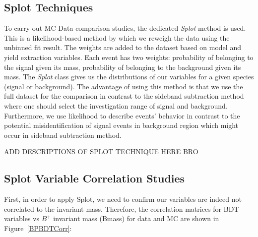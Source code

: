 \subsection{\textbf{Splot} Techniques}

To carry out MC-Data comparison studies, the dedicated \textit{Splot} method is used. This is a likelihood-based method by which we reweigh the data using the unbinned fit result. The weights are added to the dataset based on model and yield extraction variables. Each event has two weights: probability of belonging to the signal given its mass, probability of belonging to the background given its mass. The \textit{Splot} class gives us the distributions of our variables for a given species (signal or background). The advantage of using this method is that we use the full dataset for the comparison in contrast to the sideband subtraction method where one should select the investigation range of signal and background. Furthermore, we use likelihood to describe events' behavior in contrast to the potential misidentification of signal events in background region which might occur in sideband subtraction method. 

ADD DESCRIPTIONS OF SPLOT TECHNIQUE HERE BRO

\subsection{\textbf{Splot} Variable Correlation Studies}

First, in order to apply Splot, we need to confirm our variables are indeed not correlated to the invariant mass. Therefore, the correlation matrices for BDT variables vs $B^+$ invariant mass (Bmass) for data and MC are shown in Figure~\ref{BPBDTCorr}:



